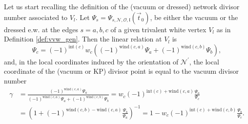 \documentclass[11pt]{amsart}
\theoremstyle{plain}
\numberwithin{equation}{section}
\begin{document}
Let us start recalling the definition of the (vacuum or dressed) network divisor number 
associated to $V_l$. Let $\Psi_s = \Psi_{s,{\mathcal N}, \mathcal O, \mathfrak l} (\vec t_0)$, be either the vacuum or the dressed e.w. at the 
edges $s=a,b,c$ of a given trivalent white vertex $V_l$ as in Definition \ref{def:vvw_gen}.
Then the linear relation at $V_l$ is
\[
\Psi_c = (-1)^{\mbox{int}(c)} w_c \left( (-1)^{\mbox{wind}(c,a)}\Psi_a + (-1)^{\mbox{wind}(c,b)}\Psi_b  \right),
\]
and, in the local coordinates induced by the orientation of ${\mathcal N}^{\prime}$, the local coordinate of the (vacuum or KP) divisor point is equal to the vacuum divisor number 
\begin{equation}\label{eq:formula_div}
\begin{array}{ll}
\gamma &\displaystyle= \frac{ (-1)^{\mbox{wind}(c,a)}\Psi_a}{(-1)^{\mbox{wind}(c,a)}\Psi_a +  (-1)^{\mbox{wind}(c,b)}\Psi_b} = w_c(-1)^{\mbox{int}(c)+\mbox{wind}(c,a)}\frac{\Psi_a}{\Psi_c}\\
&\displaystyle =\left( 1+ (-1)^{\mbox{wind}(c,b)-\mbox{wind}(c,a)}\frac{\Psi_b}{\Psi_a}\right)^{-1}= 1-w_c(-1)^{\mbox{int}(c)+\mbox{wind}(c,b)} \frac{\Psi_b}{\Psi_c}.
\end{array}
\end{equation}
\end{document}
